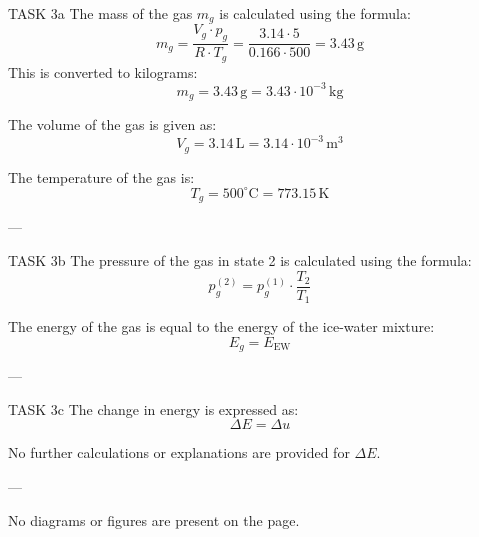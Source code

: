 TASK 3a  
The mass of the gas \( m_g \) is calculated using the formula:  
\[
m_g = \frac{V_g \cdot p_g}{R \cdot T_g} = \frac{3.14 \cdot 5}{0.166 \cdot 500} = 3.43 \, \text{g}
\]  
This is converted to kilograms:  
\[
m_g = 3.43 \, \text{g} = 3.43 \cdot 10^{-3} \, \text{kg}
\]  

The volume of the gas is given as:  
\[
V_g = 3.14 \, \text{L} = 3.14 \cdot 10^{-3} \, \text{m}^3
\]  

The temperature of the gas is:  
\[
T_g = 500^\circ\text{C} = 773.15 \, \text{K}
\]  

---

TASK 3b  
The pressure of the gas in state 2 is calculated using the formula:  
\[
p_g^{(2)} = p_g^{(1)} \cdot \frac{T_2}{T_1}
\]  

The energy of the gas is equal to the energy of the ice-water mixture:  
\[
E_g = E_{\text{EW}}
\]  

---

TASK 3c  
The change in energy is expressed as:  
\[
\Delta E = \Delta u
\]  

No further calculations or explanations are provided for \( \Delta E \).  

---

No diagrams or figures are present on the page.